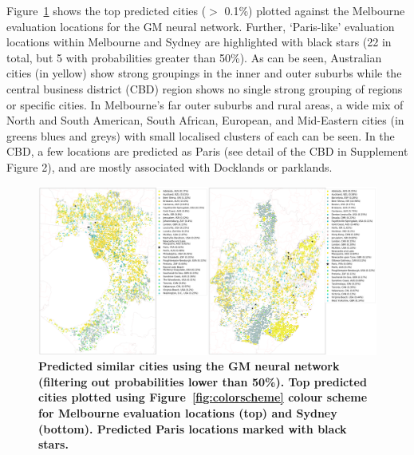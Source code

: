\documentclass[Crown,sageh,times]{sagej}
\begin{document}
Figure~\ref{fig:melmaps} shows the top predicted cities ($>$ 0.1\%) plotted against the Melbourne evaluation locations for the GM neural network. Further, `Paris-like' evaluation locations within Melbourne and Sydney are highlighted with black stars (22 in total, but 5 with probabilities greater than 50\%). As can be seen, Australian cities (in yellow) show strong groupings in the inner and outer suburbs while the central business district (CBD) region shows no single strong grouping of regions or specific cities. In Melbourne's far outer suburbs and rural areas, a wide mix of North and South American, South African, European, and Mid-Eastern cities (in greens blues and greys) with small localised clusters of each can be seen. In the CBD, a few locations are predicted as Paris (see detail of the CBD in Supplement Figure 2), and are mostly associated with Docklands or parklands.





\begin{figure}[!htbp]
\centering   
\includegraphics[scale=0.10]{Images/Figure4GM.png}  


\caption{  \bf Predicted similar cities using the GM neural network (filtering out probabilities lower than 50\%). Top predicted cities plotted using Figure~\ref{fig:colorscheme} colour scheme for Melbourne evaluation locations (top) and Sydney (bottom). Predicted Paris locations marked with black stars.}    
 \label{fig:melmaps}  
\end{figure} 
\end{document}
